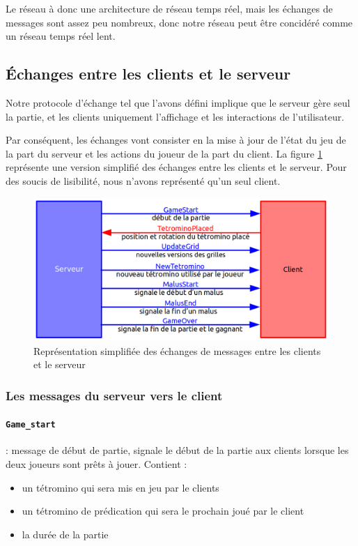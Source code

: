 \documentclass[a4paper, 12pt]{article}
\begin{document}
			Le réseau à donc une architecture de réseau temps réel, mais les échanges de messages sont assez peu nombreux, donc notre réseau peut être concidéré comme un réseau temps réel lent.

		\subsection{\'Echanges entre les clients et le serveur}

			Notre protocole d'échange tel que l'avons défini implique que le serveur gère seul la partie, et les clients uniquement l'affichage et les interactions de l'utilisateur.

			Par conséquent, les échanges vont consister en la mise à jour de l'état du jeu de la part du serveur et les actions du joueur de la part du client. 
			La figure \ref{fig:echange} représente une version simplifié des échanges entre les clients et le serveur. Pour des soucis de lisibilité, nous n'avons représenté qu'un seul client.

			\begin{figure}[bt]
				\centering
				\includegraphics[scale=0.35]{img/ech.png}
				\caption{Représentation simplifiée des échanges de messages entre les clients et le serveur}
				\label{fig:echange}
			\end{figure}


			\subsubsection{Les messages du serveur vers le client}

				\paragraph{\texttt{Game\_start}} : message de début de partie, signale le début de la partie aux clients lorsque les deux joueurs sont prêts à jouer. Contient : 
					\begin{itemize}
						\item un tétromino qui sera mis en jeu par le clients
						\item un tétromino de prédication qui sera le prochain joué par le client
						\item la durée de la partie
					\end{itemize}
\end{document}
